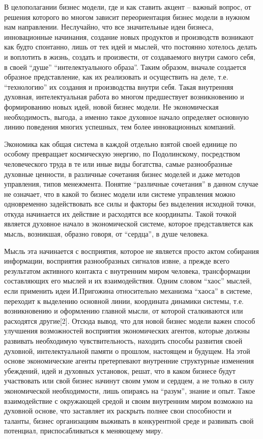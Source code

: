 \begin{multicols}{2}
В целополагании бизнес модели, где и как ставить акцент -- важный
вопрос, от решения которого во многом зависит переориентация бизнес
модели в нужном нам направлении. Неслучайно, что все значительные идеи
бизнеса, инновационные начинания, создание новых продуктов и производств
возникают как будто спонтанно, лишь от тех идей и мыслей, что постоянно
хотелось делать и воплотить в жизнь, создать и произвести, от
создаваемого внутри самого себя, в своей ``душе'' ``интелектуального
образа''. Таким образом, вначале создается образное представление, как
их реализовать и осуществить на деле, т.е. ``технологию'' их создания и
производства внутри себя. Такая внутренняя духовная, интелектуальная
работа во многом предшествует возникновению и формированию новых идей,
новой бизнес модели. Не экономическая необходимость, выгода, а именно
такое духовное начало определяет основную линию поведения многих
успешных, тем более инновационных компаний.

Экономика как общая система в каждой отдельно взятой своей единице по
особому превращает космическую энергию, по Подолинскому, посредством
человеческого труда в те или иные виды богатства, самые разнообразные
духовные ценности, в различные сочетания бизнес моделей и даже методов
управления, типов менежмента. Понятие ``различные сочетания'' в данном
случае не означает, что в какой то бизнес модели или системе управления
можно одновременно задействовать все силы и факторы без выделения
исходной точки, откуда начинается их действие и расходятся все
координаты. Такой точкой является духовное начало в экономической
системе, которое представляется как мысль, возникшая, образно говоря, от
``сердца'', в душе человека.

Мысль эта начинается с восприятия, которое не является просто актом
собирания информации, восприятия разнообразных сигналов извне, а прежде
всего результатом активного контакта с внутренним миром человека,
трансформации составляющих его мыслей и их взаимодействия. Одним словом
``хаос'' мыслей, если применить идеи И.Пригожина относительно механизма
``хаоса'' в системе, переходит к выделению основной линии, координата
динамики системы, т.е. возникновению и оформлению главной мысли, от
которой сталкиваются или расходятся другие{[}2{]}. Отсюда вывод, что для
новой бизнес модели важен способ улучшения возможностей восприятия
экономических агентов, которые должны развивать необходимую
чувствительность, находить способы развития своей духовной,
интелектуальной памяти о прошлом, настоящем и будущем. На этой основе
экономические агенты претерпевают внутренние структурные изменения
убеждений, идей и духовных установок, решат, что в каком бизнесе будут
участвовать или свой бизнес начинут своим умом и сердцем, а не только в
силу экономической необходимости, лишь опираясь на ``разум'', знание и
опыт. Такое взаимодействие с окружающей средой и своим внутренним миром
возможно на духовной основе, что заставляет их раскрыть полнее свои
способности и таланты, бизнес организациям выживать в конкурентной среде
и развивать свой потенциал, приспосабливаться к меняющему миру.


\end{multicols}
